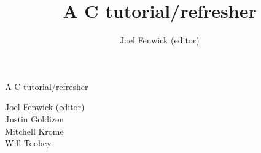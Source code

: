 \documentclass[a4paper,10pt]{book}
\begin{document}
\title{A C tutorial/refresher}
\author{Joel Fenwick (editor)}
\pagestyle{empty}

\vspace*{6cm}
\begin{center}
{\LARGE A C tutorial/refresher}\\
\end{center}
\vfill
\begin{flushright}
Joel Fenwick (editor)\\
Justin Goldizen\\
Mitchell Krome\\
Will Toohey 
\end{flushright}
\vfill
\vfill

\tableofcontents
{}
\lstset{language=C}












\appendix

\end{document}
